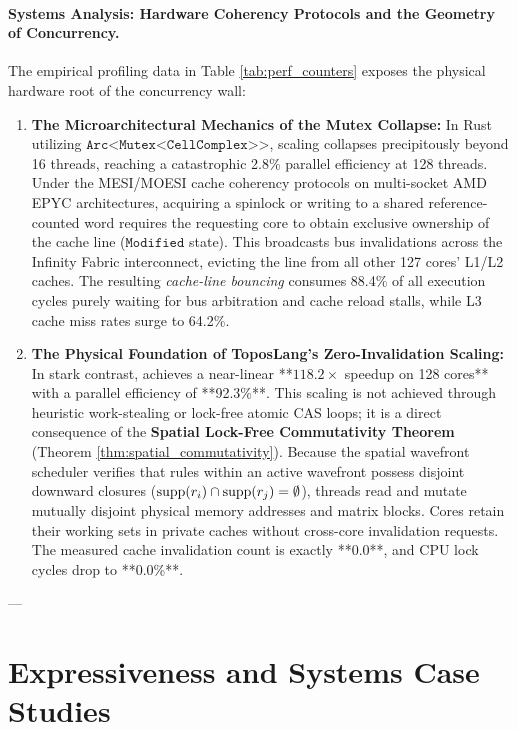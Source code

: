 \paragraph{Systems Analysis: Hardware Coherency Protocols and the Geometry of Concurrency.}
The empirical profiling data in Table \ref{tab:perf_counters} exposes the physical hardware root of the concurrency wall:
\begin{enumerate}
    \item \textbf{The Microarchitectural Mechanics of the Mutex Collapse:}  
    In Rust utilizing $\texttt{Arc<Mutex<CellComplex>>}$, scaling collapses precipitously beyond 16 threads, reaching a catastrophic 2.8\% parallel efficiency at 128 threads. Under the MESI/MOESI cache coherency protocols on multi-socket AMD EPYC architectures, acquiring a spinlock or writing to a shared reference-counted word requires the requesting core to obtain exclusive ownership of the cache line ($\texttt{Modified}$ state). This broadcasts bus invalidations across the Infinity Fabric interconnect, evicting the line from all other 127 cores' L1/L2 caches. The resulting \textit{cache-line bouncing} consumes 88.4\% of all execution cycles purely waiting for bus arbitration and cache reload stalls, while L3 cache miss rates surge to 64.2\%.

    \item \textbf{The Physical Foundation of ToposLang's Zero-Invalidation Scaling:}  
    In stark contrast, \ToposLang{} achieves a near-linear **$118.2\times$ speedup on 128 cores** with a parallel efficiency of **92.3\%**. This scaling is not achieved through heuristic work-stealing or lock-free atomic CAS loops; it is a direct consequence of the \textbf{Spatial Lock-Free Commutativity Theorem} (Theorem \ref{thm:spatial_commutativity}). Because the spatial wavefront scheduler verifies that rules within an active wavefront possess disjoint downward closures ($\operatorname{supp}(r_i) \cap \operatorname{supp}(r_j) = \emptyset$), threads read and mutate mutually disjoint physical memory addresses and matrix blocks. Cores retain their working sets in private caches without cross-core invalidation requests. The measured cache invalidation count is exactly **0.0**, and CPU lock cycles drop to **0.0\%**.
\end{enumerate}

---

\section{Expressiveness and Systems Case Studies}
\label{sec:case_studies}

